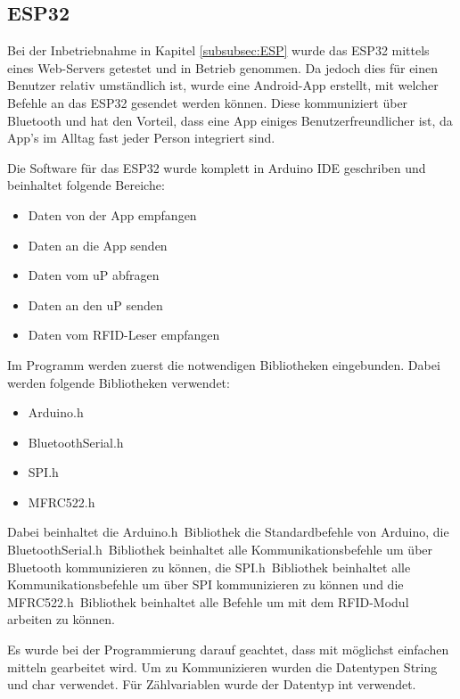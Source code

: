 \subsection{ESP32}
\label{subsec:Software_ESP32}

Bei der Inbetriebnahme in Kapitel \ref{subsubsec:ESP} wurde das ESP32 mittels eines Web-Servers getestet und in Betrieb genommen. Da jedoch dies für einen Benutzer relativ umständlich ist, wurde eine Android-App erstellt, mit welcher Befehle an das ESP32 gesendet werden können. Diese kommuniziert über Bluetooth und hat den Vorteil, dass eine App einiges Benutzerfreundlicher ist, da App's im Alltag fast jeder Person integriert sind.   

Die Software für das ESP32 wurde komplett in Arduino IDE geschriben und beinhaltet folgende Bereiche:

\begin{itemize}
\item Daten von der App empfangen
\item Daten an die App senden
\item Daten vom uP abfragen
\item Daten an den uP senden 
\item Daten vom RFID-Leser empfangen
\end{itemize}

Im Programm werden zuerst die notwendigen Bibliotheken  eingebunden. Dabei werden folgende Bibliotheken verwendet:

\begin{itemize}
\item Arduino.h
\item BluetoothSerial.h
\item SPI.h
\item MFRC522.h
\end{itemize}

Dabei beinhaltet die \flqq Arduino.h\frqq~Bibliothek die Standardbefehle von Arduino, die \flqq BluetoothSerial.h\frqq~Bibliothek beinhaltet alle Kommunikationsbefehle um über Bluetooth kommunizieren zu können, die \flqq SPI.h\frqq~Bibliothek beinhaltet alle Kommunikationsbefehle um über SPI kommunizieren zu können und die \flqq MFRC522.h\frqq~Bibliothek beinhaltet alle Befehle um mit dem RFID-Modul arbeiten zu können.

Es wurde bei der Programmierung darauf geachtet, dass mit möglichst einfachen mitteln gearbeitet wird. Um zu Kommunizieren wurden die Datentypen String und char verwendet. Für Zählvariablen wurde der Datentyp int verwendet. 